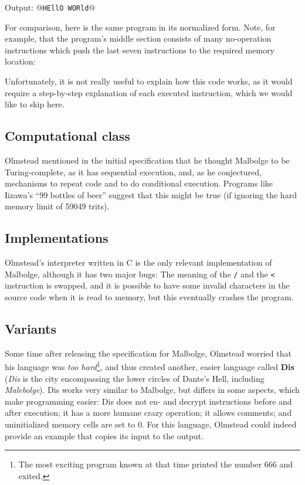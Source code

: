 \begin{io}
Output: @\texttt{HEllO WORld}@
\end{io}

For comparison, here is the same program in its normalized form. Note, for example, that the program's middle section consists of many no-operation instructions which push the last seven instructions to the required memory location:



Unfortunately, it is not really useful to explain how this code works, as it would require a step-by-step explanation of each executed instruction, which we would like to skip here.

\subsection{Computational class}

Olmstead mentioned in the initial specification that he thought Malbolge to be Turing-complete, as it has sequential execution, and, as he conjectured, mechanisms to repeat code and to do conditional execution. Programs like Iizawa's “99 bottles of beer” suggest that this might be true (if ignoring the hard memory limit of 59049 trits).

\subsection{Implementations}

Olmstead's interpreter written in C \cite{olmstead1998malbolge} is the only relevant implementation of Malbolge, although it has two major bugs: The meaning of the \texttt{/} and the \texttt{<} instruction is swapped, and it is possible to have some invalid characters in the source code when it is read to memory, but this eventually crashes the program.

\subsection{Variants}

Some time after releasing the specification for Malbolge, Olmstead worried that his language was \emph{too hard}\footnote{The most exciting program known at that time printed the number 666 and exited.}, and thus created another, easier language called \textbf{Dis} (\emph{Dis} is the city encompassing the lower circles of Dante's Hell, including \emph{Malebolge}). Dis works very similar to Malbolge, but differs in some aspects, which make programming easier: Dis does not en- and decrypt instructions before and after execution; it has a more humane crazy operation; it allows comments; and uninitialized memory cells are set to 0. For this language, Olmstead could indeed provide an example that copies its input to the output.

